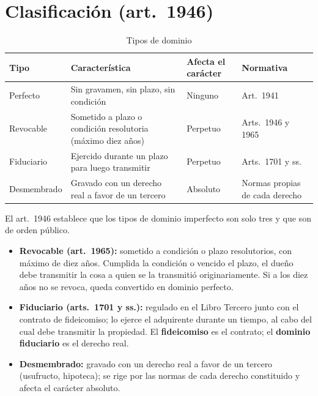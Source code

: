 \documentclass[12pt,oneside]{book}
\begin{document}
\section{Clasificación (art.~1946)}

\begin{table}[H]
\centering
\small
\begin{tabularx}{\textwidth}{>{\raggedright\arraybackslash}p{}>{\raggedright\arraybackslash}X>{\raggedright\arraybackslash}p{}>{\raggedright\arraybackslash}p{}}
\toprule
\textbf{Tipo} & \textbf{Característica} & \textbf{Afecta el carácter} & \textbf{Normativa} \\
\midrule
Perfecto & Sin gravamen, sin plazo, sin condición & Ninguno & Art.~1941 \\
Revocable & Sometido a plazo o condición resolutoria (máximo diez años) & Perpetuo & Arts.~1946 y 1965 \\
Fiduciario & Ejercido durante un plazo para luego transmitir & Perpetuo & Arts.~1701 y ss. \\
Desmembrado & Gravado con un derecho real a favor de un tercero & Absoluto & Normas propias de cada derecho \\
\bottomrule
\end{tabularx}
\caption{Tipos de dominio}
\end{table}

El art.~1946 establece que los tipos de dominio imperfecto son solo tres y que son de orden público.

\begin{itemize}
    \item \textbf{Revocable (art.~1965):} sometido a condición o plazo resolutorios, con máximo de diez años. Cumplida la condición o vencido el plazo, el dueño debe transmitir la cosa a quien se la transmitió originariamente. Si a los diez años no se revoca, queda convertido en dominio perfecto.
    \item \textbf{Fiduciario (arts.~1701 y ss.):} regulado en el Libro Tercero junto con el contrato de fideicomiso; lo ejerce el adquirente durante un tiempo, al cabo del cual debe transmitir la propiedad. El \textbf{fideicomiso} es el contrato; el \textbf{dominio fiduciario} es el derecho real.
    \item \textbf{Desmembrado:} gravado con un derecho real a favor de un tercero (usufructo, hipoteca); se rige por las normas de cada derecho constituido y afecta el carácter absoluto.
\end{itemize}
\end{document}

